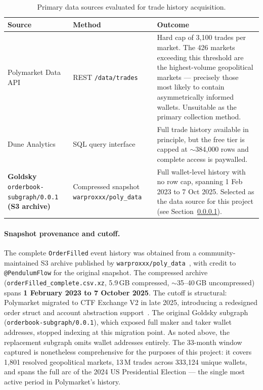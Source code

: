 \begin{table}[H]
\centering
\caption{Primary data sources evaluated for trade history acquisition.}
\label{tab:data_sources}
\small
\begin{tabularx}{\textwidth}{p{3.8cm} p{3.2cm} X}
\toprule
\textbf{Source} & \textbf{Method} & \textbf{Outcome} \\
\midrule
Polymarket Data API
    & REST \texttt{/data/trades}
    & Hard cap of 3{,}100 trades per market.
      The 426 markets exceeding this threshold are the
      highest-volume geopolitical markets — precisely those
      most likely to contain asymmetrically informed wallets.
      Unsuitable as the primary collection method. \\
\addlinespace[4pt]
Dune Analytics
    & SQL query interface
    & Full trade history available in principle, but the
      free tier is capped at $\sim$384{,}000 rows and
      complete access is paywalled. \\
\addlinespace[4pt]
\textbf{Goldsky} \texttt{orderbook-subgraph/0.0.1}
\textbf{(S3 archive)}
    & Compressed snapshot \newline
      \texttt{warproxxx/poly\_data}~\cite{poly_data_github}
    & Full wallet-level history with no row cap,
      spanning 1 Feb 2023 to 7 Oct 2025.
      Selected as the data source for this project
      (see Section~\ref{sec:snapshot_cutoff}). \\
\bottomrule
\end{tabularx}
\end{table}

\paragraph{Snapshot provenance and cutoff.}
\label{sec:snapshot_cutoff}
The complete \texttt{OrderFilled} event history was obtained from a
community-maintained S3 archive published by
\texttt{warproxxx/poly\_data}~\cite{poly_data_github},
with credit to \texttt{@PendulumFlow} for the original snapshot.
The compressed archive (\texttt{orderFilled\_complete.csv.xz},
5.9\,GB compressed, $\sim$35--40\,GB uncompressed) spans
\textbf{1 February 2023 to 7 October 2025}.
The cutoff is structural: Polymarket migrated to CTF Exchange V2 in
late 2025, introducing a redesigned order struct and account
abstraction support~\cite{polymarket_v2}.
The original Goldsky subgraph (\texttt{orderbook-subgraph/0.0.1}),
which exposed full maker and taker wallet addresses, stopped indexing
at this migration point.
As noted above, the replacement subgraph omits wallet addresses entirely.
The 33-month window captured is nonetheless comprehensive for the
purposes of this project: it covers 1,801 resolved geopolitical
markets, 13\,M trades across 333{,}124 unique wallets, and spans the
full arc of the 2024 US Presidential Election — the single most
active period in Polymarket's history.








